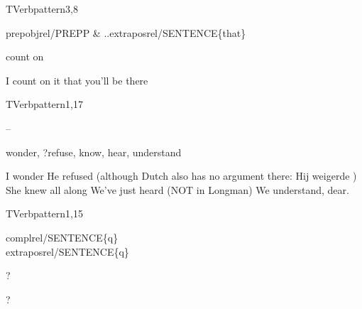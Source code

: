 \newpage
\verbpattern{[synPREPTHATSENT]}
\begin{vpattern}
 TVerbpattern3,8
\csritem \mbox{}\\
     \begin{csr}
     prepobjrel/PREPP & ..extraposrel/SENTENCE\{that\}
     \end{csr}
\remarksitem 
\end{vpattern}


\begin{thetadescr}
\evitem count on
\esitem
     \begin{examples}
        \example I count on it that you'll be there
     \end{examples}
\end{thetadescr}


\newpage
\verbpattern{[synPROSENT] }
\begin{vpattern}
 TVerbpattern1,17
\csritem \mbox{}\\
     \begin{csr}
      --
     \end{csr}
\remarksitem
\end{vpattern}



\begin{thetadescr}
\evitem wonder, ?refuse, know, 
hear, understand
\esitem
     \begin{examples}
        \example I wonder
        \example He refused  (although Dutch also has no argument there: 
                 Hij weigerde )
        \example She knew all along
        \example We've just heard (NOT in Longman)
        \example We understand, dear.
     \end{examples}
\end{thetadescr}


\newpage
\verbpattern{[synQSENT]}
\begin{vpattern}
 TVerbpattern1,15
\csritem \mbox{}\\
     \begin{csr}
      complrel/SENTENCE\{q\}\\
      extraposrel/SENTENCE\{q\}
     \end{csr}
\remarksitem
\end{vpattern}


\begin{thetadescr}
\evitem ?
\esitem
     \begin{examples}
        \example ?
     \end{examples}
\end{thetadescr}


